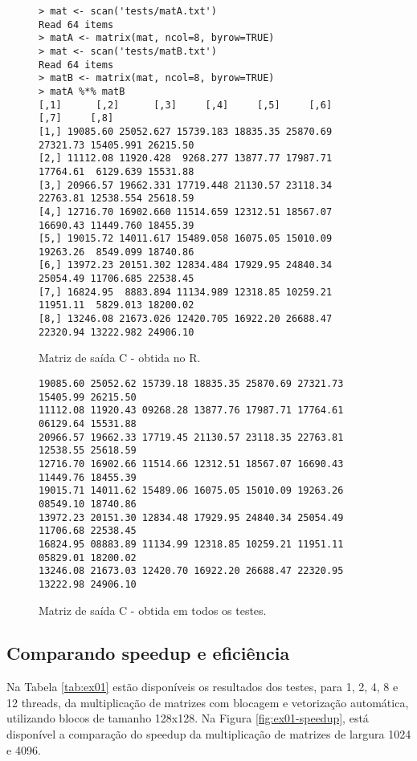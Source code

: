 \documentclass[conference]{IEEEtran}
\begin{document}
\begin{table}[htb!]
\begin{figure}[htb!]
\begin{adjustbox}{max width=\linewidth}
\begin{BVerbatim}
> mat <- scan('tests/matA.txt')
Read 64 items
> matA <- matrix(mat, ncol=8, byrow=TRUE)
> mat <- scan('tests/matB.txt')
Read 64 items
> matB <- matrix(mat, ncol=8, byrow=TRUE)
> matA %
[,1]      [,2]      [,3]     [,4]     [,5]     [,6]      [,7]     [,8]
[1,] 19085.60 25052.627 15739.183 18835.35 25870.69 27321.73 15405.991 26215.50
[2,] 11112.08 11920.428  9268.277 13877.77 17987.71 17764.61  6129.639 15531.88
[3,] 20966.57 19662.331 17719.448 21130.57 23118.34 22763.81 12538.554 25618.59
[4,] 12716.70 16902.660 11514.659 12312.51 18567.07 16690.43 11449.760 18455.39
[5,] 19015.72 14011.617 15489.058 16075.05 15010.09 19263.26  8549.099 18740.86
[6,] 13972.23 20151.302 12834.484 17929.95 24840.34 25054.49 11706.685 22538.45
[7,] 16824.95  8883.894 11134.989 12318.85 10259.21 11951.11  5829.013 18200.02
[8,] 13246.08 21673.026 12420.705 16922.20 26688.47 22320.94 13222.982 24906.10
\end{BVerbatim}
\end{adjustbox}
\caption{Matriz de saída C - obtida no R. \label{fig:matC-R}}
\end{figure}

\begin{figure}[htb!]
	\begin{adjustbox}{max width=\linewidth}
		\begin{BVerbatim}
19085.60 25052.62 15739.18 18835.35 25870.69 27321.73 15405.99 26215.50
11112.08 11920.43 09268.28 13877.76 17987.71 17764.61 06129.64 15531.88
20966.57 19662.33 17719.45 21130.57 23118.35 22763.81 12538.55 25618.59
12716.70 16902.66 11514.66 12312.51 18567.07 16690.43 11449.76 18455.39
19015.71 14011.62 15489.06 16075.05 15010.09 19263.26 08549.10 18740.86
13972.23 20151.30 12834.48 17929.95 24840.34 25054.49 11706.68 22538.45
16824.95 08883.89 11134.99 12318.85 10259.21 11951.11 05829.01 18200.02
13246.08 21673.03 12420.70 16922.20 26688.47 22320.95 13222.98 24906.10
		\end{BVerbatim}
	\end{adjustbox}
	\caption{Matriz de saída C - obtida em todos os testes. \label{fig:matC}}
\end{figure}

\subsection{Comparando speedup e eficiência}
Na Tabela \ref{tab:ex01} estão disponíveis os resultados dos testes, para 1, 2, 4, 8 e 12 threads, da multiplicação de matrizes com blocagem e vetorização automática, utilizando blocos de tamanho 128x128. Na Figura \ref{fig:ex01-speedup}, está disponível a comparação do speedup da multiplicação de matrizes de largura 1024 e 4096.


\end{table}
\end{document}

